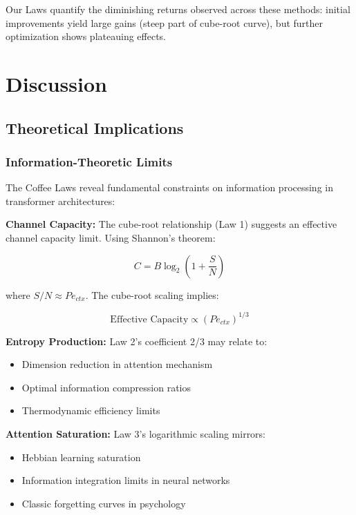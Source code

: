 \documentclass[conference]{IEEEtran}
\begin{document}
Our Laws quantify the diminishing returns observed across these methods: initial improvements yield large gains (steep part of cube-root curve), but further optimization shows plateauing effects.

\section{Discussion}

\subsection{Theoretical Implications}

\subsubsection{Information-Theoretic Limits}

The Coffee Laws reveal fundamental constraints on information processing in transformer architectures:

\textbf{Channel Capacity:} The cube-root relationship (Law 1) suggests an effective channel capacity limit. Using Shannon's theorem:

\begin{equation}
C = B \log_2\left(1 + \frac{S}{N}\right)
\end{equation}

where $S/N \approx Pe_{ctx}$. The cube-root scaling implies:

\begin{equation}
\text{Effective Capacity} \propto (Pe_{ctx})^{1/3}
\end{equation}

\textbf{Entropy Production:} Law 2's coefficient 2/3 may relate to:
\begin{itemize}
\item Dimension reduction in attention mechanism
\item Optimal information compression ratios
\item Thermodynamic efficiency limits
\end{itemize}

\textbf{Attention Saturation:} Law 3's logarithmic scaling mirrors:
\begin{itemize}
\item Hebbian learning saturation
\item Information integration limits in neural networks
\item Classic forgetting curves in psychology
\end{itemize}
\end{document}
